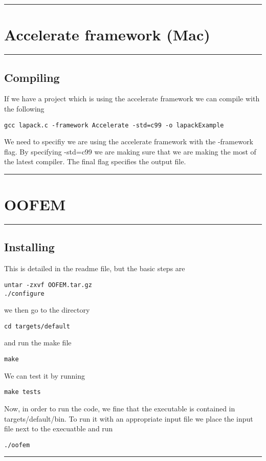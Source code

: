 \documentclass[a4paper, 10pt]{article}
\newcommand{\mytoprule}{\hrule\vspace{4mm}}
\newcommand{\mybotrule}{\vspace{4mm}\hrule}
\begin{document}
\mybotrule

\vspace{10mm}
\section*{Accelerate framework (Mac)}

\mytoprule
\subsection*{Compiling}
If we have a project which is using the accelerate framework we can compile with the following
\begin{Verbatim}
gcc lapack.c -framework Accelerate -std=c99 -o lapackExample
\end{Verbatim}
We need to specifiy we are using the accelerate framework with the -framework flag. By specifying -std=c99 we are making sure that we are making the most of the latest compiler. The final flag specifies the output file. 
\mybotrule


\vspace{10mm}
\section*{OOFEM}

\mytoprule
\subsection*{Installing}
This is detailed in the readme file, but the basic steps are 
\begin{Verbatim}
untar -zxvf OOFEM.tar.gz
./configure
\end{Verbatim}
we then go to the directory
\begin{Verbatim}
cd targets/default
\end{Verbatim}
and run the make file
\begin{Verbatim}
make
\end{Verbatim}
We can test it by running
\begin{Verbatim}
make tests
\end{Verbatim}

Now, in order to run the code, we fine that the executable is contained in targets/default/bin. To run it with an appropriate input file we place the input file next to the execuatble and run 
\begin{Verbatim}
./oofem
\end{Verbatim}
\mybotrule
\end{document}
